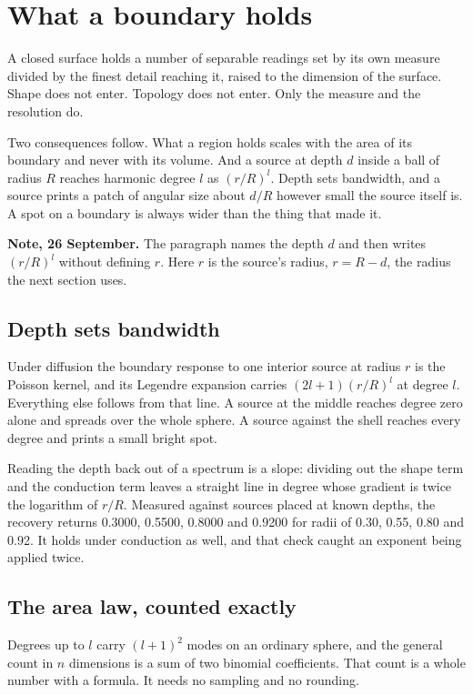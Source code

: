 \chapter{What a boundary holds}

A closed surface holds a number of separable readings set by its own measure divided by the finest detail reaching it, raised to the dimension of the surface. Shape does not enter. Topology does not enter. Only the measure and the resolution do.

Two consequences follow. What a region holds scales with the area of its boundary and never with its volume. And a source at depth $d$ inside a ball of radius $R$ reaches harmonic degree $l$ as $(r/R)^l$. Depth sets bandwidth, and a source prints a patch of angular size about $d/R$ however small the source itself is. A spot on a boundary is always wider than the thing that made it.

\textbf{Note, 26 September.} The paragraph names the depth $d$ and then writes $(r/R)^l$ without defining $r$. Here $r$ is the source's radius, $r = R - d$, the radius the next section uses.

\section{Depth sets bandwidth}

Under diffusion the boundary response to one interior source at radius $r$ is the Poisson kernel, and its Legendre expansion carries $(2l+1)(r/R)^l$ at degree $l$. Everything else follows from that line. A source at the middle reaches degree zero alone and spreads over the whole sphere. A source against the shell reaches every degree and prints a small bright spot.

Reading the depth back out of a spectrum is a slope: dividing out the shape term and the conduction term leaves a straight line in degree whose gradient is twice the logarithm of $r/R$. Measured against sources placed at known depths, the recovery returns 0.3000, 0.5500, 0.8000 and 0.9200 for radii of 0.30, 0.55, 0.80 and 0.92. It holds under conduction as well, and that check caught an exponent being applied twice.

\section{The area law, counted exactly}

Degrees up to $l$ carry $(l+1)^2$ modes on an ordinary sphere, and the general count in $n$ dimensions is a sum of two binomial coefficients. That count is a whole number with a formula. It needs no sampling and no rounding.

